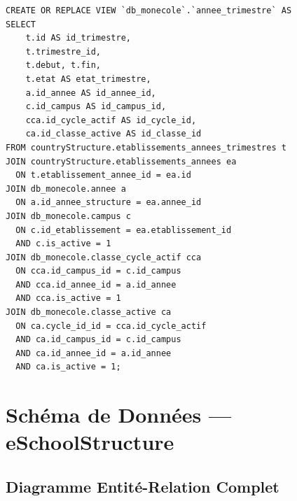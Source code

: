 \documentclass[12pt,a4paper,oneside]{report}
\begin{document}
\begin{lstlisting}[style=sql, title=Pattern ``Universal Context'']
CREATE OR REPLACE VIEW `db_monecole`.`annee_trimestre` AS
SELECT 
    t.id AS id_trimestre,
    t.trimestre_id,
    t.debut, t.fin,
    t.etat AS etat_trimestre,
    a.id_annee AS id_annee_id,
    c.id_campus AS id_campus_id,
    cca.id_cycle_actif AS id_cycle_id,
    ca.id_classe_active AS id_classe_id
FROM countryStructure.etablissements_annees_trimestres t
JOIN countryStructure.etablissements_annees ea 
  ON t.etablissement_annee_id = ea.id
JOIN db_monecole.annee a 
  ON a.id_annee_structure = ea.annee_id
JOIN db_monecole.campus c 
  ON c.id_etablissement = ea.etablissement_id 
  AND c.is_active = 1
JOIN db_monecole.classe_cycle_actif cca 
  ON cca.id_campus_id = c.id_campus 
  AND cca.id_annee_id = a.id_annee 
  AND cca.is_active = 1
JOIN db_monecole.classe_active ca 
  ON ca.cycle_id_id = cca.id_cycle_actif 
  AND ca.id_campus_id = c.id_campus 
  AND ca.id_annee_id = a.id_annee 
  AND ca.is_active = 1;
\end{lstlisting}


\chapter{Schéma de Données — eSchoolStructure}

\section{Diagramme Entité-Relation Complet}
\end{document}
